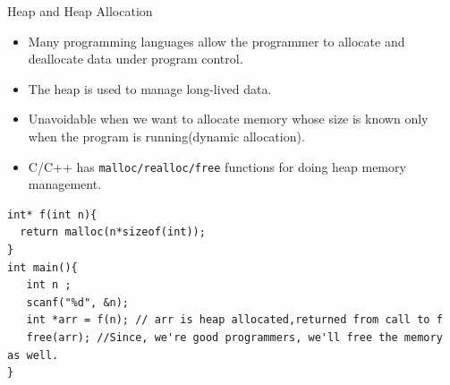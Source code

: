 \documentclass[
  10pt,
  ignorenonframetext,
]{beamer}
\providecommand{\tightlist}{%
  \setlength{\itemsep}{0pt}\setlength{\parskip}{0pt}}
\begin{document}
\begin{frame}[fragile]{Heap and Heap Allocation}
\protect\hypertarget{heap-and-heap-allocation}{}
\pause

\begin{itemize}
\tightlist
\item
  Many programming languages allow the programmer
  to allocate and deallocate data under program
  control.
\end{itemize}

\pause

\begin{itemize}
\tightlist
\item
  The heap is used to manage long-lived data.
\end{itemize}

\pause

\begin{itemize}
\tightlist
\item
  Unavoidable when we want to allocate memory
  whose size is known only when the program is
  running(dynamic allocation).
\end{itemize}

\pause

\begin{itemize}
\tightlist
\item
  C/C++ has \texttt{malloc/realloc/free} functions
  for doing heap memory management.
\end{itemize}

\pause

\footnotesize

\begin{verbatim}
int* f(int n){
  return malloc(n*sizeof(int));
}
int main(){
   int n ;
   scanf("%d", &n);
   int *arr = f(n); // arr is heap allocated,returned from call to f
   free(arr); //Since, we're good programmers, we'll free the memory as well.
}
\end{verbatim}

\normalsize
\end{frame}
\end{document}
